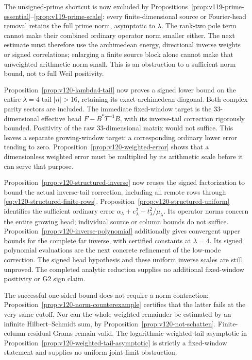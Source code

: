 \documentclass[11pt]{article}
\theoremstyle{remark}
\begin{document}
The unsigned-prime shortcut is now excluded by
Propositions~\ref{prop:v119-prime-essential}--\ref{prop:v119-prime-scale}:
every finite-dimensional source or Fourier-head removal retains the
full prime norm, asymptotic to $\lambda$. The rank-two pole term cannot
make their combined ordinary operator norm smaller either. The next
estimate must therefore use the archimedean energy, directional inverse
weights or signed correlations; enlarging a finite source block alone
cannot make that unweighted arithmetic norm small. This is an
obstruction to a sufficient norm bound, not to full Weil positivity.

Proposition~\ref{prop:v120-lambda4-tail} now proves a signed lower
bound on the entire $\lambda=4$ tail $|n|>16$, retaining its exact
archimedean diagonal. Both complex parity sectors are included.
The immediate fixed-window target is the $33$-dimensional effective
head $F-B^*T^{-1}B$, with its inverse-tail correction rigorously
bounded. Positivity of the raw $33$-dimensional matrix would not suffice.
This leaves a separate growing-window target: a corresponding ordinary
lower error tending to zero. Proposition~\ref{prop:v120-weighted-error}
shows that a dimensionless weighted error must be multiplied by its
arithmetic scale before it can serve that purpose.

Proposition~\ref{prop:v120-structured-inverse} now reuses the signed
factorization to bound the actual inverse-tail correction, including
all remote rows through \eqref{eq:v120-structured-finite-rows}.
Proposition~\ref{prop:v120-structured-uniform} identifies the sufficient
ordinary error $\alpha_\lambda+e_\lambda^2+
 t_\lambda^2/\mu_\lambda$. Its operator norms concern the entire
growing head; individual source or column bounds do not suffice.
Proposition~\ref{prop:v120-inverse-polynomial} additionally gives
convergent upper bounds for the complete far inverse, with certified
constants at $\lambda=4$. Its signed polynomial evaluations are the
next concrete refinement of the low-mode correction.
The signed head hypothesis and these uniform inverse scales are still
unproved. The completed analytic reduction supplies no additional
fixed-window positivity or G2 sign claim.

The successful one-sided bound does not require a norm contraction:
Proposition~\ref{prop:v120-norm-counterexample} certifies that the
latter fails at the very same cutoff. Nor can the whole weighted
remainder be estimated by an infinite Hilbert--Schmidt sum, by
Proposition~\ref{prop:v120-not-schatten}. Finite-column residual Grams
remain valid. The logarithmic weighted-tail asymptotic in
Proposition~\ref{prop:v120-weighted-tail-asymptotic} is strictly a
fixed-window statement and supplies no uniform joint-limit obstruction.
\end{document}
